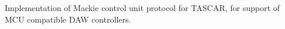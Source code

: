 Implementation of Mackie control unit protocol for TASCAR, for support of MCU compatible DAW controllers.

